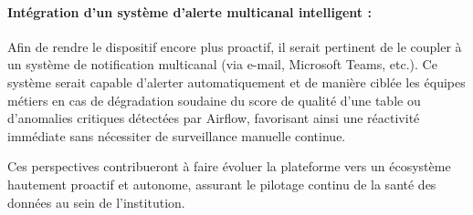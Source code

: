 \paragraph{Intégration d'un système d'alerte multicanal intelligent :} Afin de rendre le dispositif encore plus proactif, il serait pertinent de le coupler à un système de notification multicanal (via e-mail, Microsoft Teams, etc.). Ce système serait capable d'alerter automatiquement et de manière ciblée les équipes métiers en cas de dégradation soudaine du score de qualité d'une table ou d'anomalies critiques détectées par Airflow, favorisant ainsi une réactivité immédiate sans nécessiter de surveillance manuelle continue.

Ces perspectives contribueront à faire évoluer la plateforme vers un écosystème hautement proactif et autonome, assurant le pilotage continu de la santé des données au sein de l'institution.
